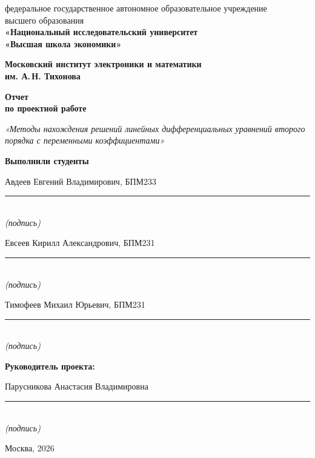 \documentclass[14pt,a4paper]{extarticle}
\begin{document}
\begin{titlepage}
\fontsize{14}{16}\selectfont
\setlength{\parindent}{0pt}
\begin{center}
федеральное государственное автономное образовательное учреждение\\
высшего образования\\
\textbf{«Национальный исследовательский университет\\
«Высшая школа экономики»}

\vspace{6mm}
\textbf{Московский институт электроники и математики\\
им. А.\,Н. Тихонова}

\vspace{29mm}
\textbf{Отчет\\по проектной работе}

\vspace{3mm}
\textit{«Методы нахождения решений линейных дифференциальных уравнений второго порядка с переменными коэффициентами»}
\end{center}

\vspace{18mm}
\begin{flushright}
{\fontsize{12}{14}\selectfont\textbf{Выполнили студенты}}
\end{flushright}
\vspace{3mm}
{\fontsize{12}{15}\selectfont
\newcommand{\studentfield}[1]{%
\begin{minipage}[t]{0.47\textwidth}
\raggedleft
#1\par
\vspace{4mm}
\rule{45mm}{0.4pt}\\[-1mm]
\textit{(подпись)}
\end{minipage}}
\noindent
\studentfield{Авдеев Евгений Владимирович, БПМ233}\hfill
\studentfield{Евсеев Кирилл Александрович, БПМ231}\par
\vspace{8mm}
\noindent
\studentfield{Тимофеев Михаил Юрьевич, БПМ231}\par
}

\vspace{13mm}
\textbf{Руководитель проекта:}\par
\vspace{6mm}
Парусникова Анастасия Владимировна\par
\vspace{5mm}
\rule{55mm}{0.4pt}\\[-1mm]
{\fontsize{12}{14}\selectfont\textit{(подпись)}}

\vfill
\begin{center}Москва, 2026\end{center}
\end{titlepage}
\restoregeometry
\end{document}
